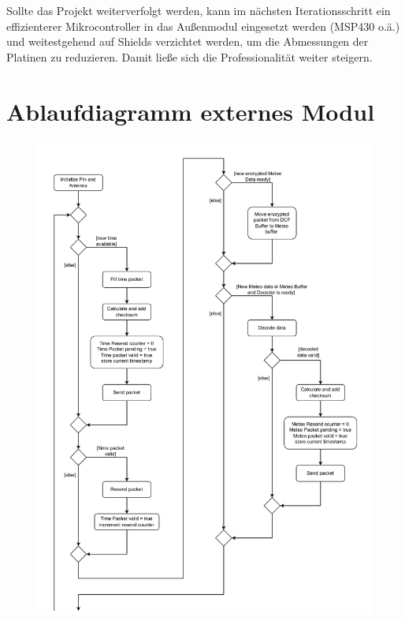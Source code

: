 \documentclass[a4paper,11pt]{article}
\begin{document}
\vspace{0.2cm}
\noindent
Sollte das Projekt weiterverfolgt werden, kann im nächsten Iterationsschritt ein effizienterer Mikrocontroller in das Außenmodul eingesetzt werden (MSP430 o.ä.)
und weitestgehend auf Shields verzichtet werden, um die Abmessungen der Platinen zu reduzieren. Damit ließe sich die Professionalität weiter steigern. 

\clearpage
\appendix

\section{Ablaufdiagramm externes Modul}
\label{subapp:ablaufExt}

\begin{figure}[H]
  \centering
  \includegraphics[scale=0.75, page=1]{Ablauf extern.pdf}
\end{figure}
\end{document}
